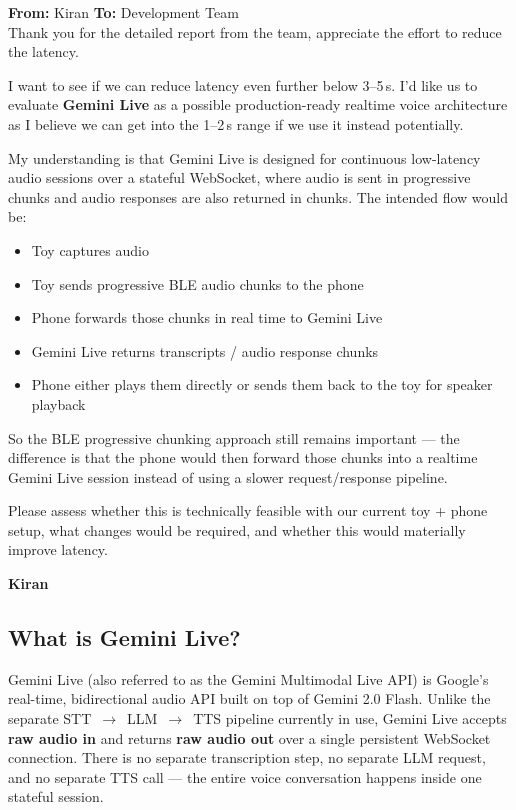 \documentclass[12pt,a4paper]{article}
\begin{document}
\begin{clientbox}
\textbf{From:} Kiran \hfill \textbf{To:} Development Team\\[6pt]

Thank you for the detailed report from the team, appreciate the effort to reduce the latency.

I want to see if we can reduce latency even further below 3--5\,s. I'd like us to evaluate
\textbf{Gemini Live} as a possible production-ready realtime voice architecture as I believe we
can get into the 1--2\,s range if we use it instead potentially.

My understanding is that Gemini Live is designed for continuous low-latency audio sessions over
a stateful WebSocket, where audio is sent in progressive chunks and audio responses are also
returned in chunks. The intended flow would be:

\begin{itemize}[leftmargin=1.5em]
  \item Toy captures audio
  \item Toy sends progressive BLE audio chunks to the phone
  \item Phone forwards those chunks in real time to Gemini Live
  \item Gemini Live returns transcripts / audio response chunks
  \item Phone either plays them directly or sends them back to the toy for speaker playback
\end{itemize}

So the BLE progressive chunking approach still remains important — the difference is that the
phone would then forward those chunks into a realtime Gemini Live session instead of using a
slower request/response pipeline.

Please assess whether this is technically feasible with our current toy + phone setup, what
changes would be required, and whether this would materially improve latency.

\medskip
\textbf{Kiran}
\end{clientbox}

\subsection{What is Gemini Live?}

Gemini Live (also referred to as the Gemini Multimodal Live API) is Google's real-time,
bidirectional audio API built on top of Gemini 2.0 Flash. Unlike the separate
STT~$\rightarrow$~LLM~$\rightarrow$~TTS pipeline currently in use, Gemini Live accepts
\textbf{raw audio in} and returns \textbf{raw audio out} over a single persistent WebSocket
connection. There is no separate transcription step, no separate LLM request, and no separate
TTS call — the entire voice conversation happens inside one stateful session.
\end{document}

